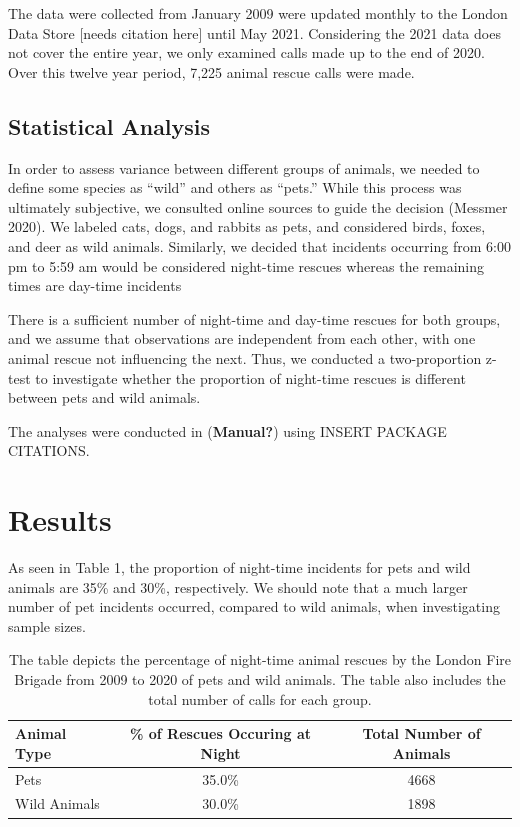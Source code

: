 \documentclass[
]{article}
\begin{document}
The data were collected from January 2009 were updated monthly to the
London Data Store {[}needs citation here{]} until May 2021. Considering
the 2021 data does not cover the entire year, we only examined calls
made up to the end of 2020. Over this twelve year period, 7,225 animal
rescue calls were made.

\hypertarget{statistical-analysis}{%
\subsection{Statistical Analysis}\label{statistical-analysis}}

In order to assess variance between different groups of animals, we
needed to define some species as ``wild'' and others as ``pets.'' While
this process was ultimately subjective, we consulted online sources to
guide the decision (Messmer 2020). We labeled cats, dogs, and rabbits as
pets, and considered birds, foxes, and deer as wild animals. Similarly,
we decided that incidents occurring from 6:00 pm to 5:59 am would be
considered night-time rescues whereas the remaining times are day-time
incidents

There is a sufficient number of night-time and day-time rescues for both
groups, and we assume that observations are independent from each other,
with one animal rescue not influencing the next. Thus, we conducted a
two-proportion z-test to investigate whether the proportion of
night-time rescues is different between pets and wild animals.

The analyses were conducted in (\textbf{Manual?}) using INSERT PACKAGE
CITATIONS.

\hypertarget{results}{%
\section{Results}\label{results}}

As seen in Table 1, the proportion of night-time incidents for pets and
wild animals are 35\% and 30\%, respectively. We should note that a much
larger number of pet incidents occurred, compared to wild animals, when
investigating sample sizes.

\hypertarget{tbl-night-summary}{}
\begin{table}
\caption{\label{tbl-night-summary}The table depicts the percentage of night-time animal rescues by the
London Fire Brigade from 2009 to 2020 of pets and wild animals. The
table also includes the total number of calls for each group. }\tabularnewline

\centering
\begin{tabular}[t]{lcc}
\toprule
Animal Type & \% of Rescues Occuring at Night & Total Number of Animals\\
\midrule
Pets & 35.0\% & 4668\\
Wild Animals & 30.0\% & 1898\\
\bottomrule
\end{tabular}
\end{table}
\end{document}
